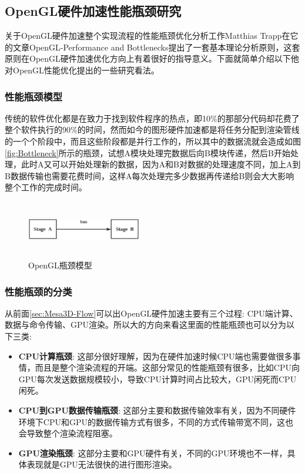 \subsection{OpenGL硬件加速性能瓶颈研究}

关于OpenGL硬件加速整个实现流程的性能瓶颈优化分析工作Matthias Trapp在它的文章OpenGL-Performance and Bottlenecks\cite{OpenGL-Performance}提出了一套基本理论分析原则，这套原则在OpenGL硬件加速优化方向上有着很好的指导意义。下面就简单介绍以下他对OpenGL性能优化提出的一些研究看法。

\subsubsection{性能瓶颈模型}

传统的软件优化都是在致力于找到软件程序的热点，即10\%的那部分代码却花费了整个软件执行的90\%的时间，然而如今的图形硬件加速都是将任务分配到渲染管线的一个个阶段中，而且这些阶段都是并行工作的，所以其中的数据流就会造成如图\ref{fig:Bottleneck}所示的瓶颈，试想A模块处理完数据后向B模块传递，然后B开始处理，此时A又可以开始处理新的数据，因为A和B对数据的处理速度不同，加上A到B数据传输也需要花费时间，这样A每次处理完多少数据再传递给B则会大大影响整个工作的完成时间。

\begin{figure}[H] 
  \centering
  \includegraphics[width=5cm,height=2.5cm]{figures/chap02/Bottleneck-Model}
  \caption{OpenGL瓶颈模型}
  \label{fig:Bottleneck-Model}
\end{figure}

\subsubsection{性能瓶颈的分类}

从前面\ref{sec:Mesa3D-Flow}可以出OpenGL硬件加速主要有三个过程: CPU端计算、数据与命令传输、GPU渲染。所以大的方向来看这里面的性能瓶颈也可以分为以下三类:

\begin{itemize}
\item{\textbf{CPU计算瓶颈}}: 这部分很好理解，因为在硬件加速时候CPU端也需要做很多事情，而且是整个渲染流程的开端。这部分常见的性能瓶颈有很多，比如CPU向GPU每次发送数据规模较小，导致CPU计算时间占比较大，GPU闲死而CPU闲死。
\item{\textbf{CPU到GPU数据传输瓶颈}}: 这部分主要和数据传输效率有关，因为不同硬件环境下CPU和GPU的数据传输方式有很多，不同的方式传输带宽不同，这也会导致整个渲染流程阻塞。
\item{\textbf{GPU渲染瓶颈}}: 这部分主要和GPU硬件有关，不同的GPU环境也不一样，具体表现就是GPU无法很快的进行图形渲染。
\end{itemize}

